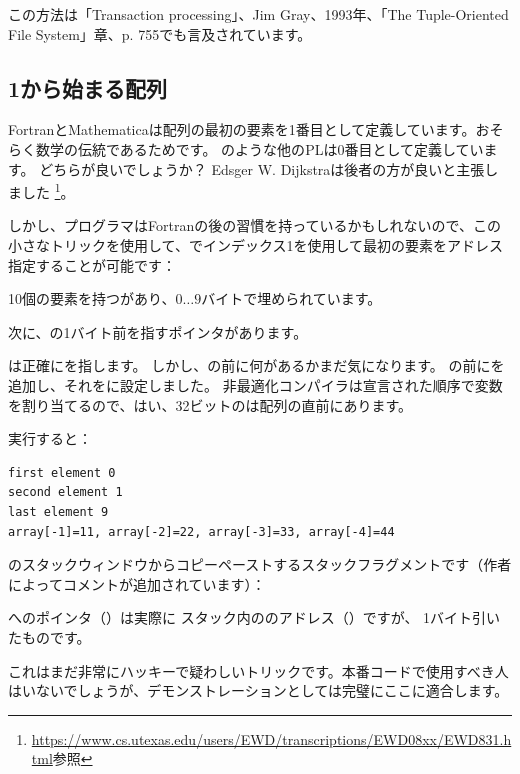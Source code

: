 この方法は「Transaction processing」、Jim Gray、1993年、「The Tuple-Oriented File System」章、p. 755でも言及されています。

\subsection{1から始まる配列}
\label{arrays_at_one}

FortranとMathematicaは配列の最初の要素を1番目として定義しています。おそらく数学の伝統であるためです。
\CCpp のような他の\ac{PL}は0番目として定義しています。
どちらが良いでしょうか？
Edsger W. Dijkstraは後者の方が良いと主張しました
\footnote{\url{https://www.cs.utexas.edu/users/EWD/transcriptions/EWD08xx/EWD831.html}参照}。

しかし、プログラマはFortranの後の習慣を持っているかもしれないので、この小さなトリックを使用して、\CCpp でインデックス1を使用して最初の要素をアドレス指定することが可能です：





10個の要素を持つがあり、$0 \ldots 9$バイトで埋められています。

次に、の1バイト前を指すポインタがあります。

は正確にを指します。
しかし、の前に何があるかまだ気になります。
の前にを追加し、それをに設定しました。
非最適化コンパイラは宣言された順序で変数を割り当てるので、はい、32ビットのは配列の直前にあります。

実行すると：

\begin{lstlisting}
first element 0
second element 1
last element 9
array[-1]=11, array[-2]=22, array[-3]=33, array[-4]=44
\end{lstlisting}

\olly のスタックウィンドウからコピーペーストするスタックフラグメントです（作者によってコメントが追加されています）：



へのポインタ（）は実際に
スタック内ののアドレス（）ですが、
1バイト引いたものです。

これはまだ非常にハッキーで疑わしいトリックです。本番コードで使用すべき人はいないでしょうが、デモンストレーションとしては完璧にここに適合します。
